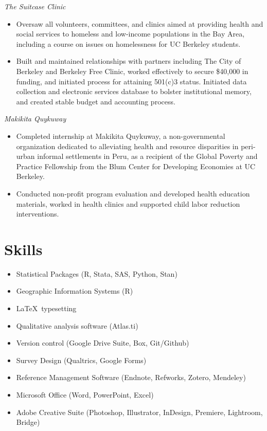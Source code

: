 \documentclass{cv_style}
\begin{document}
\textit{The Suitcase Clinic}
\begin{itemize}
    \item Oversaw all volunteers, committees, and clinics aimed at providing health and social services to homeless and low-income populations in the Bay Area, including a course on issues on homelessness for UC Berkeley  students. 
    \item \parskip 1pt Built and maintained relationships with partners including The City of Berkeley and Berkeley Free Clinic, worked effectively to secure \$40,000 in funding, and initiated process for attaining 501(c)3 status. Initiated data collection and electronic services database to bolster institutional memory, and created stable budget and accounting process.
\end{itemize}

\textit{Makikita Quykuway}
\begin{itemize}
    \item Completed internship at Makikita Quykuway, a non-governmental organization dedicated to alleviating health and resource disparities in peri-urban informal settlements in Peru, as a recipient of the Global Poverty and Practice Fellowship from the Blum Center for Developing Economies at UC Berkeley.
    \item \parskip 1pt Conducted non-profit program evaluation and developed health education materials, worked in health clinics and supported child labor reduction interventions.
\end{itemize}


\section{Skills}
\begin{itemize}
    \item Statistical Packages (R, Stata, SAS, Python, Stan)
    \item \parskip 1pt Geographic Information Systems (R)
    \item \parskip 1pt \LaTeX \ typesetting
    \item \parskip 1pt Qualitative analysis software (Atlas.ti)
    \item \parskip 1pt Version control (Google Drive Suite, Box, Git/Github)
    \item \parskip 1pt Survey Design (Qualtrics, Google Forms)
    \item \parskip 1pt Reference Management Software (Endnote, Refworks, Zotero, Mendeley)
    \item \parskip 1pt Microsoft Office (Word, PowerPoint, Excel)
    \item \parskip 1pt Adobe Creative Suite (Photoshop, Illustrator, InDesign, Premiere, Lightroom, Bridge)
\end{itemize}
\end{document}
